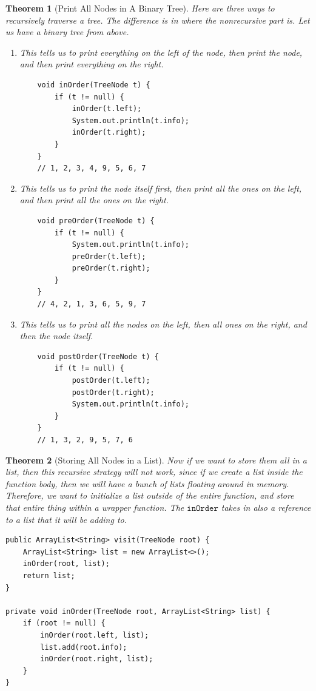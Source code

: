 \documentclass{article}
\newtheorem{theorem}{Theorem}[section]
\theoremstyle{definition}
\theoremstyle{remark}
\theoremstyle{definition}
\begin{document}
\begin{theorem}[Print All Nodes in A Binary Tree]
Here are three ways to recursively traverse a tree. The difference is in where the nonrecursive part is. Let us have a binary tree from above. 
\begin{enumerate}
    \item This tells us to print everything on the left of the node, then print the node, and then print everything on the right. 
    \begin{verbatim}
    void inOrder(TreeNode t) {
        if (t != null) {
            inOrder(t.left);
            System.out.println(t.info); 
            inOrder(t.right); 
        }
    }
    // 1, 2, 3, 4, 9, 5, 6, 7
    \end{verbatim}
    
    \item This tells us to print the node itself first, then print all the ones on the left, and then print all the ones on the right. 
    \begin{verbatim}
    void preOrder(TreeNode t) {
        if (t != null) {
            System.out.println(t.info); 
            preOrder(t.left); 
            preOrder(t.right); 
        }
    }
    // 4, 2, 1, 3, 6, 5, 9, 7
    \end{verbatim}
    
    \item This tells us to print all the nodes on the left, then all ones on the right, and then the node itself. 
    \begin{verbatim}
    void postOrder(TreeNode t) {
        if (t != null) {
            postOrder(t.left); 
            postOrder(t.right); 
            System.out.println(t.info); 
        }
    }
    // 1, 3, 2, 9, 5, 7, 6
    \end{verbatim}
\end{enumerate}
\end{theorem}

\begin{theorem}[Storing All Nodes in a List]
Now if we want to store them all in a list, then this recursive strategy will not work, since if we create a list inside the function body, then we will have a bunch of lists floating around in memory. Therefore, we want to initialize a list outside of the entire function, and store that entire thing within a wrapper function. The $\texttt{inOrder}$ takes in also a reference to a list that it will be adding to. 
\begin{verbatim}
public ArrayList<String> visit(TreeNode root) {
    ArrayList<String> list = new ArrayList<>(); 
    inOrder(root, list); 
    return list; 
}

private void inOrder(TreeNode root, ArrayList<String> list) {
    if (root != null) {
        inOrder(root.left, list); 
        list.add(root.info); 
        inOrder(root.right, list); 
    }
}
\end{verbatim}
\end{theorem}
\end{document}
